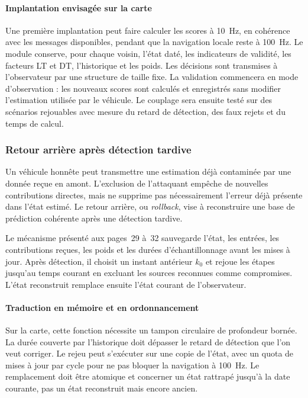 \paragraph{Implantation envisagée sur la carte}
Une première implantation peut faire calculer les scores à 10~Hz, en cohérence avec les messages disponibles, pendant que la navigation locale reste à 100~Hz. Le module conserve, pour chaque voisin, l'état daté, les indicateurs de validité, les facteurs LT et DT, l'historique et les poids. Les décisions sont transmises à l'observateur par une structure de taille fixe. La validation commencera en mode d'observation : les nouveaux scores sont calculés et enregistrés sans modifier l'estimation utilisée par le véhicule. Le couplage sera ensuite testé sur des scénarios rejouables avec mesure du retard de détection, des faux rejets et du temps de calcul.
\FloatBarrier

\subsubsection{Retour arrière après détection tardive}
\label{sec:rollback}

Un véhicule honnête peut transmettre une estimation déjà contaminée par une donnée reçue en amont. L'exclusion de l'attaquant empêche de nouvelles contributions directes, mais ne supprime pas nécessairement l'erreur déjà présente dans l'état estimé. Le retour arrière, ou \emph{rollback}, vise à reconstruire une base de prédiction cohérente après une détection tardive.

Le mécanisme présenté aux pages~29 à~32 sauvegarde l'état, les entrées, les contributions reçues, les poids et les durées d'échantillonnage avant les mises à jour. Après détection, il choisit un instant antérieur $k_0$ et rejoue les étapes jusqu'au temps courant en excluant les sources reconnues comme compromises. L'état reconstruit remplace ensuite l'état courant de l'observateur.


\paragraph{Traduction en mémoire et en ordonnancement}
Sur la carte, cette fonction nécessite un tampon circulaire de profondeur bornée. La durée couverte par l'historique doit dépasser le retard de détection que l'on veut corriger. Le rejeu peut s'exécuter sur une copie de l'état, avec un quota de mises à jour par cycle pour ne pas bloquer la navigation à 100~Hz. Le remplacement doit être atomique et concerner un état rattrapé jusqu'à la date courante, pas un état reconstruit mais encore ancien.

